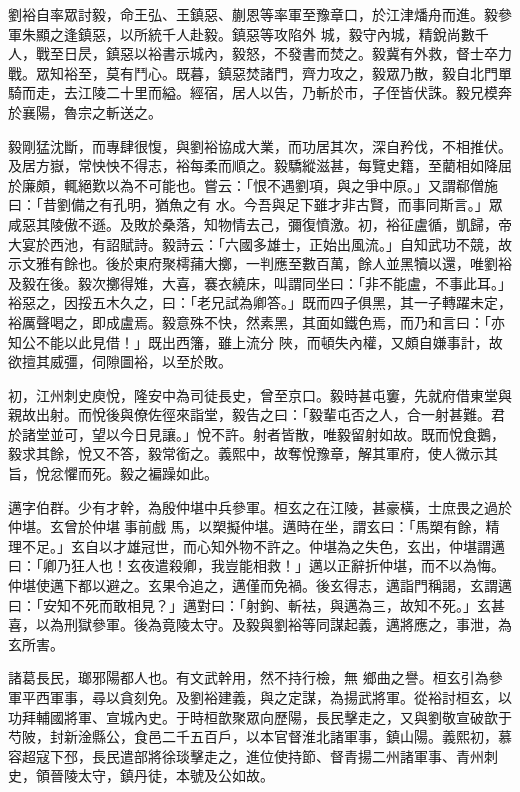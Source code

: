 \begin{pinyinscope}
 劉裕自率眾討毅，命王弘、王鎮惡、蒯恩等率軍至豫章口，於江津燔舟而進。毅參軍朱顯之逢鎮惡，以所統千人赴毅。鎮惡等攻陷外
 城，毅守內城，精銳尚數千人，戰至日昃，鎮惡以裕書示城內，毅怒，不發書而焚之。毅冀有外救，督士卒力戰。眾知裕至，莫有鬥心。既暮，鎮惡焚諸門，齊力攻之，毅眾乃散，毅自北門單騎而走，去江陵二十里而縊。經宿，居人以告，乃斬於市，子侄皆伏誅。毅兄模奔於襄陽，魯宗之斬送之。



 毅剛猛沈斷，而專肆很愎，與劉裕協成大業，而功居其次，深自矜伐，不相推伏。及居方嶽，常怏怏不得志，裕每柔而順之。毅驕縱滋甚，每覽史籍，至藺相如降屈於廉頗，輒絕歎以為不可能也。嘗云：「恨不遇劉項，與之爭中原。」又謂郗僧施曰：「昔劉備之有孔明，猶魚之有
 水。今吾與足下雖才非古賢，而事同斯言。」眾咸惡其陵傲不遜。及敗於桑落，知物情去己，彌復憤激。初，裕征盧循，凱歸，帝大宴於西池，有詔賦詩。毅詩云：「六國多雄士，正始出風流。」自知武功不競，故示文雅有餘也。後於東府聚樗蒱大擲，一判應至數百萬，餘人並黑犢以還，唯劉裕及毅在後。毅次擲得雉，大喜，褰衣繞床，叫謂同坐曰：「非不能盧，不事此耳。」裕惡之，因挼五木久之，曰：「老兄試為卿答。」既而四子俱黑，其一子轉躍未定，裕厲聲喝之，即成盧焉。毅意殊不快，然素黑，其面如鐵色焉，而乃和言曰：「亦知公不能以此見借！」既出西籓，雖上流分
 陜，而頓失內權，又頗自嫌事計，故欲擅其威彊，伺隙圖裕，以至於敗。



 初，江州刺史庾悅，隆安中為司徒長史，曾至京口。毅時甚屯窶，先就府借東堂與親故出射。而悅後與僚佐徑來詣堂，毅告之曰：「毅輩屯否之人，合一射甚難。君於諸堂並可，望以今日見讓。」悅不許。射者皆散，唯毅留射如故。既而悅食鵝，毅求其餘，悅又不答，毅常銜之。義熙中，故奪悅豫章，解其軍府，使人微示其旨，悅忿懼而死。毅之褊躁如此。



 邁字伯群。少有才幹，為殷仲堪中兵參軍。桓玄之在江陵，甚豪橫，士庶畏之過於仲堪。玄曾於仲堪事前戲
 馬，以槊擬仲堪。邁時在坐，謂玄曰：「馬槊有餘，精理不足。」玄自以才雄冠世，而心知外物不許之。仲堪為之失色，玄出，仲堪謂邁曰：「卿乃狂人也！玄夜遣殺卿，我豈能相救！」邁以正辭折仲堪，而不以為悔。仲堪使邁下都以避之。玄果令追之，邁僅而免禍。後玄得志，邁詣門稱謁，玄謂邁曰：「安知不死而敢相見？」邁對曰：「射鉤、斬袪，與邁為三，故知不死。」玄甚喜，以為刑獄參軍。後為竟陵太守。及毅與劉裕等同謀起義，邁將應之，事泄，為玄所害。



 諸葛長民，瑯邪陽都人也。有文武幹用，然不持行檢，無
 鄉曲之譽。桓玄引為參軍平西軍事，尋以貪刻免。及劉裕建義，與之定謀，為揚武將軍。從裕討桓玄，以功拜輔國將軍、宣城內史。于時桓歆聚眾向歷陽，長民擊走之，又與劉敬宣破歆于芍陂，封新淦縣公，食邑二千五百戶，以本官督淮北諸軍事，鎮山陽。義熙初，慕容超寇下邳，長民遣部將徐琰擊走之，進位使持節、督青揚二州諸軍事、青州刺史，領晉陵太守，鎮丹徒，本號及公如故。




\end{pinyinscope}
